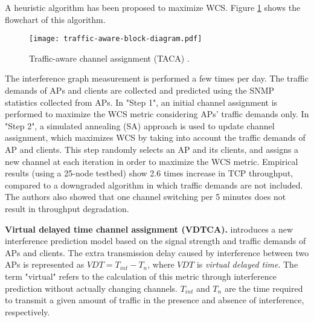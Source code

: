 %
%
%
%

A heuristic algorithm has been proposed to maximize WCS. 
Figure \ref{fig_traffic-aware} shows the flowchart of this algorithm.
%
\begin{figure}[!t]
	\centering
	\texttt{[image: traffic-aware-block-diagram.pdf]}
	\caption{Traffic-aware channel assignment (TACA) \cite{Traffic-aware-CA-2007}.}
	\label{fig_traffic-aware}
\end{figure}
%
The interference graph measurement is performed a few times per day. %
The traffic demands of APs and clients are collected and predicted using the SNMP statistics collected from APs.
In "Step 1", an initial channel assignment is performed to maximize the WCS metric considering APs' traffic demands only. 
In "Step 2", a simulated annealing (SA) approach is used to update channel assignment, which maximizes WCS by taking into account the traffic demands of AP and clients. 
This step randomly selects an AP and its clients, and assigns a new channel at each iteration in order to maximize the WCS metric. 
Empirical results (using a 25-node testbed) show 2.6 times increase in TCP throughput, compared to a downgraded algorithm in which traffic demands are not included.
The authors also showed that one channel switching per 5 minutes does not result in throughput degradation. 

\label{VDTCA}
\textbf{Virtual delayed time channel assignment (VDTCA).}
\cite{Measurement-CA-WCNC-10} introduces a new interference prediction model based on the signal strength and traffic demands of APs and clients. 
The extra transmission delay caused by interference between two APs is represented as $VDT = T_{int} - T_{n}$, where $VDT$ is \textit{virtual delayed time}. 
The term "virtual" refers to the calculation of this metric through interference prediction without actually changing channels.  
$T_{int}$ and $T_{n}$ are the time required to transmit a given amount of traffic in the presence and absence of interference, respectively.

